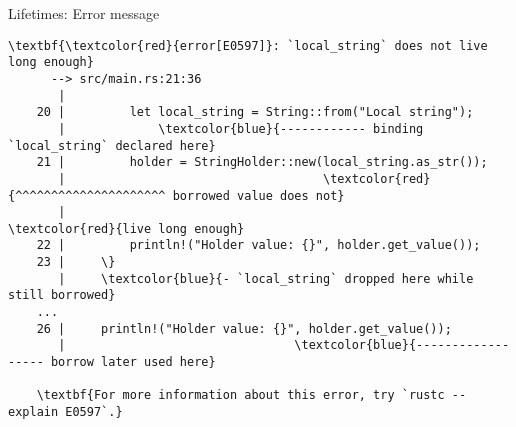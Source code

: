 \documentclass{beamer}
\begin{document}
\begin{frame}[fragile]{Lifetimes: Error message}
  \begin{listing}
    \raggedleft
    \tiny
    \begin{Verbatim}[commandchars=\\\{\}]
      \textbf{\textcolor{red}{error[E0597]}: `local_string` does not live long enough}
      --> src/main.rs:21:36
       |
    20 |         let local_string = String::from("Local string");
       |             \textcolor{blue}{------------ binding `local_string` declared here}
    21 |         holder = StringHolder::new(local_string.as_str());
       |                                    \textcolor{red}{^^^^^^^^^^^^^^^^^^^^^ borrowed value does not}
       |                                                                 \textcolor{red}{live long enough}
    22 |         println!("Holder value: {}", holder.get_value());
    23 |     \}
       |     \textcolor{blue}{- `local_string` dropped here while still borrowed}
    ...
    26 |     println!("Holder value: {}", holder.get_value());
       |                                \textcolor{blue}{------------------ borrow later used here}
    
    \textbf{For more information about this error, try `rustc --explain E0597`.}
    \end{Verbatim}
  \end{listing}
\end{frame}
\end{document}
